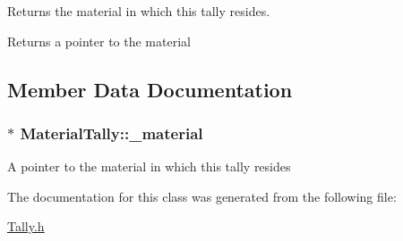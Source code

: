 Returns the material in which this tally resides. 

\begin{DoxyReturn}{Returns}
a pointer to the material 
\end{DoxyReturn}


\subsection{Member Data Documentation}
\hypertarget{classMaterialTally_a7dcd60be3a3ccd3631aa2ef1cc3057ec}{
\subsubsection[{\-\_\-material}]{$\ast$ Material\-Tally\-::\-\_\-material\hspace{0.3cm}{\ttfamily [protected]}}}\label{classMaterialTally_a7dcd60be3a3ccd3631aa2ef1cc3057ec}
A pointer to the material in which this tally resides 

The documentation for this class was generated from the following file\-:\begin{DoxyCompactItemize}
\item 
\hyperlink{Tally_8h}{Tally.\-h}\end{DoxyCompactItemize}
